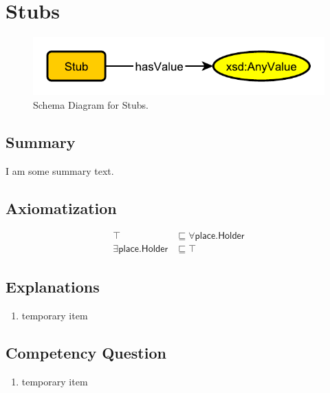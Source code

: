 \section{Stubs}
\label{sec:Stubs}
\begin{figure}[h!]
\begin{center}
\includegraphics[width=.4\textwidth]{figures/stubs}
\end{center}
\caption{Schema Diagram for Stubs.}
\label{fig:Stubs}
\end{figure}
\subsection{Summary}
\label{sum:Stubs}
I am some summary text.

\subsection{Axiomatization}
\label{axs:Stubs}
\begin{align}
\top &\sqsubseteq \forall\textsf{place.Holder} \\ 
\exists\textsf{place.Holder} &\sqsubseteq \top 
\end{align}

\subsection{Explanations}
\label{exp:Stubs}
\begin{enumerate}
\item temporary item
\end{enumerate}

\subsection{Competency Question}
\label{cqs:Stubs}
\begin{enumerate}[CQ1.]
\item temporary item
\end{enumerate}

\newpage
